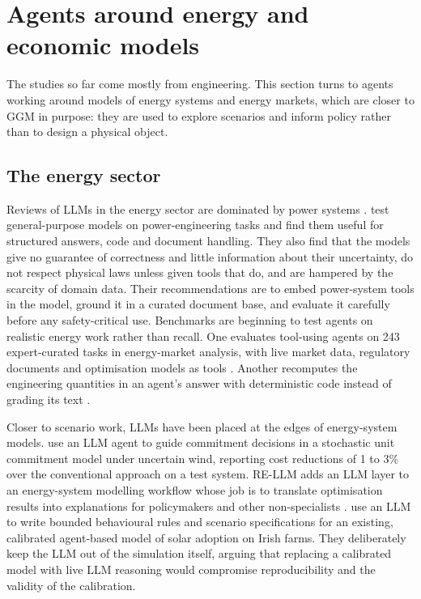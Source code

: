 \section{Agents around energy and economic models}

The studies so far come mostly from engineering.
This section turns to agents working around models of energy systems and energy markets, which are closer to GGM in purpose: they are used to explore scenarios and inform policy rather than to design a physical object.

\subsection{The energy sector}

Reviews of LLMs in the energy sector are dominated by power systems \citep{mirshekali2025review, antonesi2025transformers}.
\citet{majumder2024exploring} test general-purpose models on power-engineering tasks and find them useful for structured answers, code and document handling.
They also find that the models give no guarantee of correctness and little information about their uncertainty, do not respect physical laws unless given tools that do, and are hampered by the scarcity of domain data.
Their recommendations are to embed power-system tools in the model, ground it in a curated document base, and evaluate it carefully before any safety-critical use.
Benchmarks are beginning to test agents on realistic energy work rather than recall.
One evaluates tool-using agents on 243 expert-curated tasks in energy-market analysis, with live market data, regulatory documents and optimisation models as tools \citep{akinpelu2026tool}.
Another recomputes the engineering quantities in an agent's answer with deterministic code instead of grading its text \citep{trashchenkov2026power}.

Closer to scenario work, LLMs have been placed at the edges of energy-system models.
\citet{ren2025large} use an LLM agent to guide commitment decisions in a stochastic unit commitment model under uncertain wind, reporting cost reductions of 1 to 3\% over the conventional approach on a test system.
RE-LLM adds an LLM layer to an energy-system modelling workflow whose job is to translate optimisation results into explanations for policymakers and other non-specialists \citep{forootani2025re}.
\citet{faiud2026llm} use an LLM to write bounded behavioural rules and scenario specifications for an existing, calibrated agent-based model of solar adoption on Irish farms.
They deliberately keep the LLM out of the simulation itself, arguing that replacing a calibrated model with live LLM reasoning would compromise reproducibility and the validity of the calibration.

